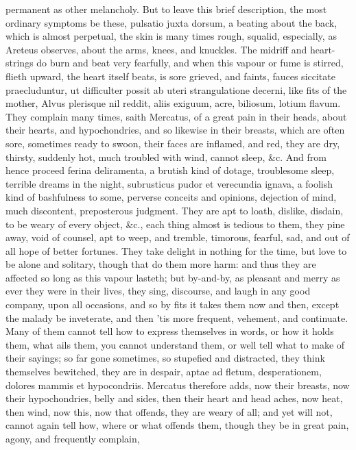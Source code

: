 {permanent as other melancholy.
But to leave this brief description, the most ordinary symptoms be
these, pulsatio juxta dorsum, a beating about the back, which is almost
perpetual, the skin is many times rough, squalid, especially, as
Areteus observes, about the arms, knees, and knuckles. The midriff and
heart-strings do burn and beat very fearfully, and when this vapour or
fume is stirred, flieth upward, the heart itself beats, is sore
grieved, and faints, fauces siccitate praecluduntur, ut difficulter
possit ab uteri strangulatione decerni, like fits of the mother, Alvus
plerisque nil reddit, aliis exiguum, acre, biliosum, lotium flavum.
They complain many times, saith Mercatus, of a great pain in their
heads, about their hearts, and hypochondries, and so likewise in their
breasts, which are often sore, sometimes ready to swoon, their faces
are inflamed, and red, they are dry, thirsty, suddenly hot, much
troubled with wind, cannot sleep, \&c. And from hence proceed ferina
deliramenta, a brutish kind of dotage, troublesome sleep, terrible
dreams in the night, subrusticus pudor et verecundia ignava, a foolish
kind of bashfulness to some, perverse conceits and opinions,
dejection of mind, much discontent, preposterous judgment. They
are apt to loath, dislike, disdain, to be weary of every object, \&c.,
each thing almost is tedious to them, they pine away, void of counsel,
apt to weep, and tremble, timorous, fearful, sad, and out of all hope
of better fortunes. They take delight in nothing for the time, but love
to be alone and solitary, though that do them more harm: and thus they
are affected so long as this vapour lasteth; but by-and-by, as pleasant
and merry as ever they were in their lives, they sing, discourse, and
laugh in any good company, upon all occasions, and so by fits it takes
them now and then, except the malady be inveterate, and then 'tis more
frequent, vehement, and continuate. Many of them cannot tell how to
express themselves in words, or how it holds them, what ails them, you
cannot understand them, or well tell what to make of their sayings; so
far gone sometimes, so stupefied and distracted, they think themselves
bewitched, they are in despair, aptae ad fletum, desperationem, dolores
mammis et hypocondriis. Mercatus therefore adds, now their breasts, now
their hypochondries, belly and sides, then their heart and head aches,
now heat, then wind, now this, now that offends, they are weary of all;
and yet will not, cannot again tell how, where or what offends
them, though they be in great pain, agony, and frequently complain,
}
